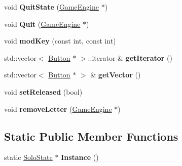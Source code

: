 \begin{DoxyCompactItemize}
\item 
\hypertarget{class_solo_state_aa97e426dc10b40be7d7379dd2ab31023}{}void {\bfseries Quit\+State} (\hyperlink{class_game_engine}{Game\+Engine} $\ast$)\label{class_solo_state_aa97e426dc10b40be7d7379dd2ab31023}

\item 
\hypertarget{class_solo_state_a86b10da90245aae9748d824a205ccdd3}{}void {\bfseries Quit} (\hyperlink{class_game_engine}{Game\+Engine} $\ast$)\label{class_solo_state_a86b10da90245aae9748d824a205ccdd3}

\item 
\hypertarget{class_solo_state_a94b1178c5ef263e485869ea47b392b8e}{}void {\bfseries mod\+Key} (const int, const int)\label{class_solo_state_a94b1178c5ef263e485869ea47b392b8e}

\item 
\hypertarget{class_solo_state_a93e767fdd5f5fc961130e6a5c08618f2}{}std\+::vector$<$ \hyperlink{class_button}{Button} $\ast$ $>$\+::iterator \& {\bfseries get\+Iterator} ()\label{class_solo_state_a93e767fdd5f5fc961130e6a5c08618f2}

\item 
\hypertarget{class_solo_state_a692942ca1bdb9b950b0f1331b5f73a92}{}std\+::vector$<$ \hyperlink{class_button}{Button} $\ast$ $>$ \& {\bfseries get\+Vector} ()\label{class_solo_state_a692942ca1bdb9b950b0f1331b5f73a92}

\item 
\hypertarget{class_solo_state_acafb945228722be28d4b4d364dcae7cf}{}void {\bfseries set\+Released} (bool)\label{class_solo_state_acafb945228722be28d4b4d364dcae7cf}

\item 
\hypertarget{class_solo_state_a6d6de11facf7376acad4709e87976f25}{}void {\bfseries remove\+Letter} (\hyperlink{class_game_engine}{Game\+Engine} $\ast$)\label{class_solo_state_a6d6de11facf7376acad4709e87976f25}

\end{DoxyCompactItemize}
\subsection*{Static Public Member Functions}
\begin{DoxyCompactItemize}
\item 
\hypertarget{class_solo_state_afa4e402f492599a8238a2b51d81cc543}{}static \hyperlink{class_solo_state}{Solo\+State} $\ast$ {\bfseries Instance} ()\label{class_solo_state_afa4e402f492599a8238a2b51d81cc543}

\end{DoxyCompactItemize}

